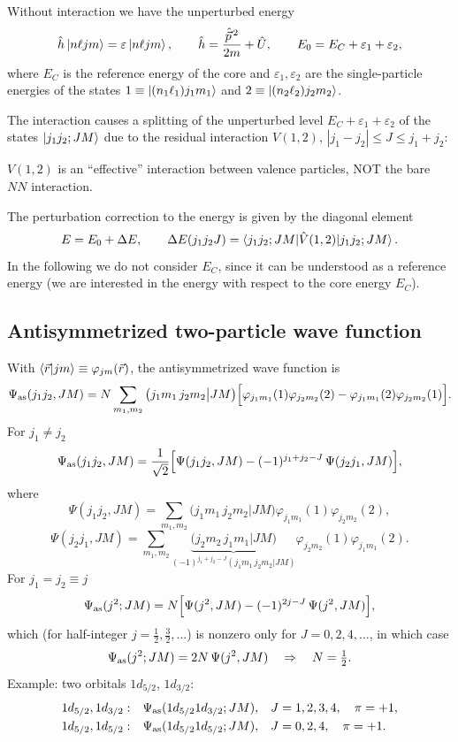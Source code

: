 \documentclass[11pt,a4paper]{article}
\newcommand{\op}[1]{\hat{#1}}
\begin{document}
Without interaction we have the unperturbed energy
\[
\op h\ket{n\ell jm}=\varepsilon\ket{n\ell jm},\qquad \op h=\frac{\op{\vec p}^{\,2}}{2m}+\op U,
\qquad
E_0=E_C+\varepsilon_1+\varepsilon_2 ,
\]
where $E_C$ is the reference energy of the core and $\varepsilon_1,\varepsilon_2$ are the single-particle energies of the states $1\equiv\ket{(n_1\ell_1)j_1m_1}$ and $2\equiv\ket{(n_2\ell_2)j_2m_2}$.

The interaction causes a splitting of the unperturbed level $E_C+\varepsilon_1+\varepsilon_2$ of the states $\ket{j_1j_2;JM}$ due to the residual interaction $V(1,2)$, $|j_1-j_2|\le J\le j_1+j_2$:
\begin{center}
\end{center}
$V(1,2)$ is an ``effective'' interaction between valence particles, NOT the bare $NN$ interaction.

The perturbation correction to the energy is given by the diagonal element
\[
E=E_0+\Delta E,\qquad \Delta E(j_1j_2J)=\braket{j_1j_2;JM|\op V(1,2)|j_1j_2;JM}.
\]
In the following we do not consider $E_C$, since it can be understood as a reference energy (we are interested in the energy with respect to the core energy $E_C$).

\subsection{Antisymmetrized two-particle wave function}
With $\braket{\vec r|jm}\equiv\varphi_{jm}(\vec r)$, the antisymmetrized wave function is
\[
\Psi_{\rm as}(j_1j_2,JM)=N\sum_{m_1,m_2}\big(j_1m_1\,j_2m_2\big|JM\big)\Big[\varphi_{j_1m_1}(1)\varphi_{j_2m_2}(2)-\varphi_{j_1m_1}(2)\varphi_{j_2m_2}(1)\Big].
\]
For $j_1\neq j_2$
\[
\Psi_{\rm as}(j_1j_2,JM)=\frac{1}{\sqrt2}\Big[\Psi(j_1j_2,JM)-(-1)^{j_1+j_2-J}\,\Psi(j_2j_1,JM)\Big],
\]
where
\[
\Psi(j_1j_2,JM)=\sum_{m_1,m_2}\big(j_1m_1\,j_2m_2\big|JM\big)\varphi_{j_1m_1}(1)\varphi_{j_2m_2}(2),
\]
\[
\Psi(j_2j_1,JM)=\sum_{m_1,m_2}\underbrace{\big(j_2m_2\,j_1m_1\big|JM\big)}_{(-1)^{j_1+j_2-J}(j_1m_1\,j_2m_2|JM)}\varphi_{j_2m_2}(1)\varphi_{j_1m_1}(2).
\]
For $j_1=j_2\equiv j$
\[
\Psi_{\rm as}(j^2;JM)=N\Big[\Psi(j^2,JM)-(-1)^{2j-J}\,\Psi(j^2,JM)\Big],
\]
which (for half-integer $j=\frac12,\frac32,\dots$) is nonzero only for $J=0,2,4,\dots$, in which case
\[
\Psi_{\rm as}(j^2;JM)=2N\,\Psi(j^2,JM)\quad\Rightarrow\quad N=\tfrac12 .
\]
Example: two orbitals $1d_{5/2}$, $1d_{3/2}$:
\[
\begin{array}{lll}
1d_{5/2},1d_{3/2}: & \Psi_{\rm as}(1d_{5/2}1d_{3/2};JM), & J=1,2,3,4,\quad \pi=+1,\\[1mm]
1d_{5/2},1d_{5/2}: & \Psi_{\rm as}(1d_{5/2}1d_{5/2};JM), & J=0,2,4,\quad \pi=+1.
\end{array}
\]
\end{document}
